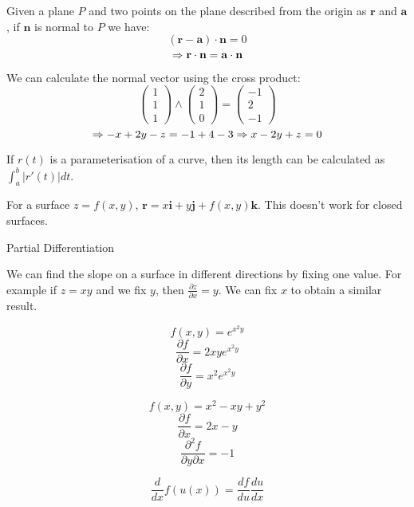 \documentclass[a4paper,10pt]{article}
\begin{document}
\begin{ex}
	Given a plane $P$ and two points on the plane described from the origin
	as $\mathbf{r}$ and $\mathbf{a}$, if $\mathbf{n}$ is normal to $P$ we
	have:
	\[ (\mathbf{r} - \mathbf{a}) \cdot \mathbf{n} = 0 \]
	\[ \Rightarrow \mathbf{r} \cdot \mathbf{n} = \mathbf{a} \cdot \mathbf{n} \]

	We can calculate the normal vector using the cross product:
	\[
		\begin{pmatrix}
			1\\1\\1
		\end{pmatrix}
		\wedge
		\begin{pmatrix}
			2\\1\\0
		\end{pmatrix}
		=
		\begin{pmatrix}
			-1\\2\\-1
		\end{pmatrix}
	\]
	\[ \Rightarrow -x + 2y - z = -1 + 4 - 3 \Rightarrow x - 2y + z = 0 \]
\end{ex}

If $r(t)$ is a parameterisation of a curve, then its length can be calculated
as $ \int_a^b | r'(t) | dt $.

For a surface $z = f(x,y)$, $\mathbf{r} = x\mathbf{i} + y\mathbf{j} +
f(x,y)\mathbf{k}$. This doesn't work for closed surfaces.


Partial Differentiation

We can find the slope on a surface in different directions by fixing one value.
For example if $z = xy$ and we fix $y$, then $\frac{\partial z}{\partial x} =
y$. We can fix $x$ to obtain a similar result.

\begin{ex}
	\[ f(x,y) = e^{x^2y} \]
	\[ \frac{\partial f}{\partial x} = 2xy e^{x^2y} \]
	\[ \frac{\partial f}{\partial y} = x^2 e^{x^2y} \]
\end{ex}

\begin{ex}
	\[ f(x,y) = x^2 - xy + y^2 \]
	\[ \frac{\partial f}{\partial x} = 2x - y \]
	\[ \frac{\partial ^2 f}{\partial y \partial x} = -1 \]
\end{ex}

\begin{thm}
	\[ \frac{d}{dx} f(u(x)) = \frac{df}{du} \frac{du}{dx} \]
\end{thm}
\end{document}
